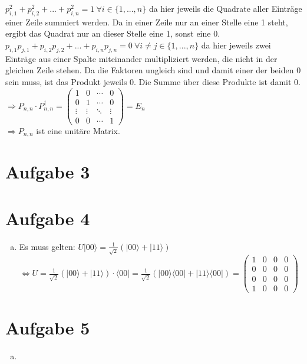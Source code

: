\documentclass[a4paper]{scrartcl}
\begin{document}
$p_{i,1}^2+p_{i,2}^2+...+p_{i,n}^2=1~\forall i \in \{1,...,n\}$ da hier jeweils die Quadrate aller Einträge einer Zeile summiert werden. Da in einer Zeile nur an einer Stelle eine 1 steht, ergibt das Quadrat nur an dieser Stelle eine 1, sonst eine 0.\\
$p_{i,1}p_{j,1}+p_{i,2}p_{j,2}+...+p_{i,n}p_{j,n} = 0~\forall i\neq j \in \{1,...,n\}$ da hier jeweils zwei Einträge aus einer Spalte miteinander multipliziert werden, die nicht in der gleichen Zeile stehen. Da die Faktoren ungleich sind und damit einer der beiden 0 sein muss, ist das Produkt jeweils 0. Die Summe über diese Produkte ist damit 0.\\
$\Rightarrow P_{n,n} \cdot P_{n,n}^{\dagger} =
\begin{pmatrix}
1 & 0 & \cdots & 0 \\
0 & 1 & \cdots & 0 \\
\vdots  & \vdots  & \ddots & \vdots  \\
0 & 0 & \cdots & 1 
\end{pmatrix} = E_n$\\
$\Rightarrow P_{n,n}$ ist eine unitäre Matrix.

\newpage
\section*{Aufgabe 3}


\newpage
\section*{Aufgabe 4}
\begin{enumerate}[a)]

\item Es muss gelten: $U |00\rangle=\frac{1}{\sqrt{2}}(|00\rangle + |11\rangle )$\\
$\Leftrightarrow U = \frac{1}{\sqrt{2}}(|00 \rangle + |11\rangle)\cdot \langle 00|= \frac{1}{\sqrt{2}}(|00\rangle \langle 00|+|11\rangle \langle 00|)= \begin{pmatrix}
1&0&0&0\\
0&0&0&0\\
0&0&0&0\\
1&0&0&0
\end{pmatrix}$
\end{enumerate}
\newpage
\section*{Aufgabe 5}
\begin{enumerate}[a)]

\item
\end{enumerate}
\end{document}

